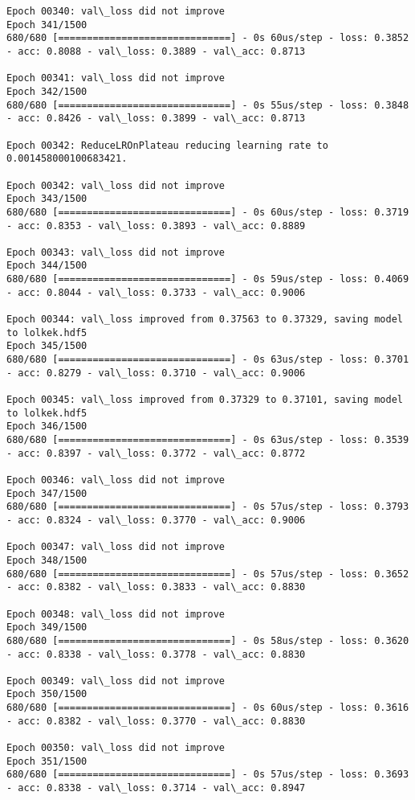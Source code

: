 \documentclass[11pt]{article}
\begin{document}
\begin{Verbatim}[commandchars=\\\{\}]
Epoch 00340: val\_loss did not improve
Epoch 341/1500
680/680 [==============================] - 0s 60us/step - loss: 0.3852 - acc: 0.8088 - val\_loss: 0.3889 - val\_acc: 0.8713

Epoch 00341: val\_loss did not improve
Epoch 342/1500
680/680 [==============================] - 0s 55us/step - loss: 0.3848 - acc: 0.8426 - val\_loss: 0.3899 - val\_acc: 0.8713

Epoch 00342: ReduceLROnPlateau reducing learning rate to 0.001458000100683421.

Epoch 00342: val\_loss did not improve
Epoch 343/1500
680/680 [==============================] - 0s 60us/step - loss: 0.3719 - acc: 0.8353 - val\_loss: 0.3893 - val\_acc: 0.8889

Epoch 00343: val\_loss did not improve
Epoch 344/1500
680/680 [==============================] - 0s 59us/step - loss: 0.4069 - acc: 0.8044 - val\_loss: 0.3733 - val\_acc: 0.9006

Epoch 00344: val\_loss improved from 0.37563 to 0.37329, saving model to lolkek.hdf5
Epoch 345/1500
680/680 [==============================] - 0s 63us/step - loss: 0.3701 - acc: 0.8279 - val\_loss: 0.3710 - val\_acc: 0.9006

Epoch 00345: val\_loss improved from 0.37329 to 0.37101, saving model to lolkek.hdf5
Epoch 346/1500
680/680 [==============================] - 0s 63us/step - loss: 0.3539 - acc: 0.8397 - val\_loss: 0.3772 - val\_acc: 0.8772

Epoch 00346: val\_loss did not improve
Epoch 347/1500
680/680 [==============================] - 0s 57us/step - loss: 0.3793 - acc: 0.8324 - val\_loss: 0.3770 - val\_acc: 0.9006

Epoch 00347: val\_loss did not improve
Epoch 348/1500
680/680 [==============================] - 0s 57us/step - loss: 0.3652 - acc: 0.8382 - val\_loss: 0.3833 - val\_acc: 0.8830

Epoch 00348: val\_loss did not improve
Epoch 349/1500
680/680 [==============================] - 0s 58us/step - loss: 0.3620 - acc: 0.8338 - val\_loss: 0.3778 - val\_acc: 0.8830

Epoch 00349: val\_loss did not improve
Epoch 350/1500
680/680 [==============================] - 0s 60us/step - loss: 0.3616 - acc: 0.8382 - val\_loss: 0.3770 - val\_acc: 0.8830

Epoch 00350: val\_loss did not improve
Epoch 351/1500
680/680 [==============================] - 0s 57us/step - loss: 0.3693 - acc: 0.8338 - val\_loss: 0.3714 - val\_acc: 0.8947


\end{Verbatim}
\end{document}
